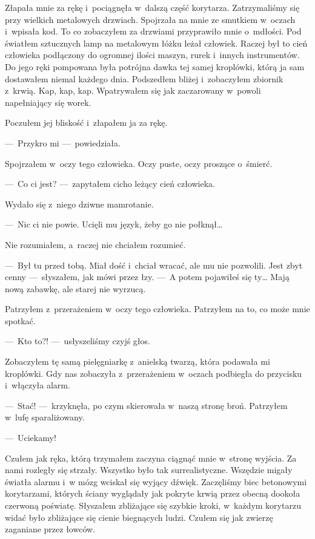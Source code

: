 Złapała mnie za rękę i~pociągnęła w~dalszą część korytarza. Zatrzymaliśmy się przy wielkich metalowych drzwiach. Spojrzała na mnie ze smutkiem w~oczach i~wpisała kod. To co zobaczyłem za drzwiami przyprawiło mnie o~mdłości. Pod światłem sztucznych lamp na metalowym łóżku leżał człowiek. Raczej był to cień człowieka podłączony do ogromnej ilości maszyn, rurek i~innych instrumentów. Do jego ręki pompowana była potrójna dawka tej samej kroplówki, którą ja sam dostawałem niemal każdego dnia. Podszedłem bliżej i~zobaczyłem zbiornik z~krwią. Kap, kap, kap. Wpatrywałem się jak zaczarowany w~powoli napełniający się worek. 

Poczułem jej bliskość i~złapałem ja za rękę. 

---~Przykro mi ---~powiedziała.

Spojrzałem w~oczy tego człowieka. Oczy puste, oczy proszące o~śmierć. 

---~Co ci jest? ---~zapytałem cicho leżący cień człowieka.

Wydało się z~niego dziwne mamrotanie.

---~Nic ci nie powie. Ucięli mu język, żeby go nie połknął…

Nie rozumiałem, a~raczej nie chciałem rozumieć.

---~Był tu przed tobą. Miał dość i~chciał wracać, ale mu nie pozwolili. Jest zbyt cenny ---~słyszałem, jak mówi przez łzy. ---~A potem pojawiłeś się ty… Mają nową zabawkę, ale starej nie wyrzucą.

Patrzyłem z~przerażeniem w~oczy tego człowieka. Patrzyłem na to, co może mnie spotkać. 

---~Kto to?! ---~usłyszeliśmy czyjś głos.

Zobaczyłem tę samą pielęgniarkę z~anielską twarzą, która podawała mi kroplówki. Gdy nas zobaczyła z~przerażeniem w~oczach podbiegła do przycisku i~włączyła alarm.

---~Stać! ---~krzyknęła, po czym skierowała w~naszą stronę broń. Patrzyłem w~lufę sparaliżowany.

---~Uciekamy!

Czułem jak ręka, którą trzymałem zaczyna ciągnąć mnie w~stronę wyjścia. Za nami rozległy się strzały. Wszystko było tak surrealistyczne. Wszędzie migały światła alarmu i~w mózg wciskał się wyjący dźwięk. Zaczęliśmy biec betonowymi korytarzami, których ściany wyglądały jak pokryte krwią przez obecną dookoła czerwoną poświatę. Słyszałem zbliżające się szybkie kroki, w~każdym korytarzu widać było zbliżające się cienie biegnących ludzi.  Czułem się jak zwierzę zaganiane przez łowców. 

